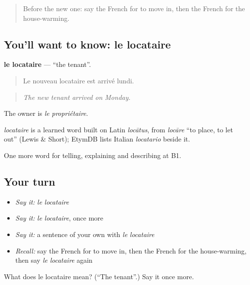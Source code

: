\begin{quote}
Before the new one: say the French for to move in, then the French for the house-warming.
\end{quote}

\subsection*{You'll want to know: le locataire}
\textbf{le locataire} — \textquotedblleft{}the tenant\textquotedblright{}.

\begin{quote}
Le nouveau locataire est arrivé lundi.
\end{quote}

\begin{quote}
\emph{The new tenant arrived on Monday.}
\end{quote}

The owner is \emph{le propriétaire}.

\begin{cousinweb}
\emph{locataire} is a learned word built on Latin \emph{locātus}, from \emph{locāre} \textquotedblleft{}to place, to let out\textquotedblright{} (Lewis \& Short); EtymDB lists Italian \emph{locatario} beside it.
\end{cousinweb}

\begin{grammarlens}[title={What you've built}]
One more word for telling, explaining and describing at B1.
\end{grammarlens}

\subsection*{Your turn}
\begin{itemize}
\raggedright
  \item \emph{Say it:} \emph{le locataire}
  \item \emph{Say it:} \emph{le locataire}, once more
  \item \emph{Say it:} a sentence of your own with \emph{le locataire}
  \item \emph{Recall:} say the French for to move in, then the French for the house-warming, then say \emph{le locataire} again
\end{itemize}

\begin{tcolorbox}[breakable,colback=teal!4,colframe=teal!35!black,title={Before you move on}]
What does le locataire mean? (\textquotedblleft{}The tenant\textquotedblright{}.) Say it once more.
\end{tcolorbox}
